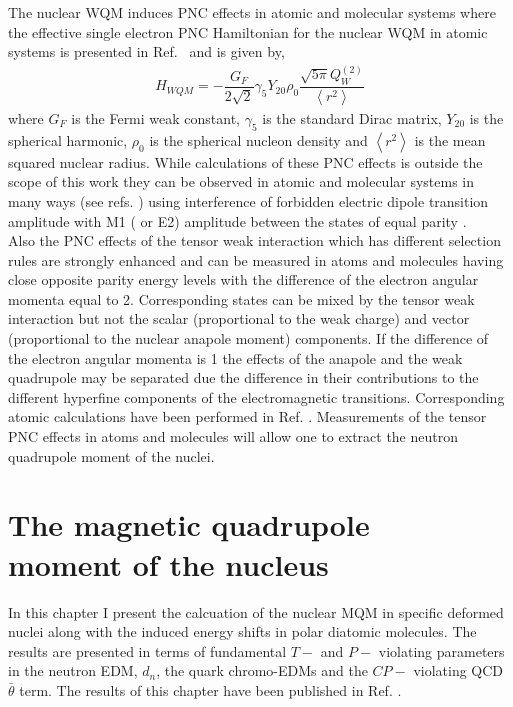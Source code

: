 \documentclass[10pt,a4paper, twoside, openright]{report}
\begin{document}
The nuclear WQM induces PNC effects in atomic and molecular systems where the effective single electron  PNC Hamiltonian for the nuclear WQM in atomic systems is presented in Ref.~\cite{FDC17} and is given by,
\begin{align*}
H_{WQM}=-\dfrac{G_F}{2\sqrt{2}}\gamma_5Y_{20}\rho_{0}\dfrac{\sqrt{5\pi}Q_{W}^{(2)}}{\left<r^2\right>}
\end{align*}
where $G_F$ is the Fermi weak constant, $\gamma_5$ is the standard Dirac matrix, $Y_{20}$ is the spherical harmonic, $\rho_0$ is the spherical nucleon density and $\left<r^2\right>$ is the mean squared nuclear radius. While calculations of these PNC effects is outside the scope of this work they can be observed in atomic and molecular systems in many ways (see refs. \cite{FDC17, Roberts2015, KhriplovichPNC, GingesReview}) using interference of forbidden electric dipole transition amplitude with M1 ( or E2) amplitude between the states of equal parity \cite{FDC17}.\\
\linebreak
Also the PNC effects of the tensor weak interaction which has different selection rules are strongly enhanced  and can be measured in atoms and molecules having close opposite parity energy levels with the difference of the electron angular momenta equal to 2. Corresponding states can be mixed by the tensor weak interaction but not the scalar (proportional to the  weak charge) and vector (proportional to the nuclear anapole moment) components. If the difference of the electron angular momenta is 1 the effects of the anapole and the weak quadrupole may be separated due the difference in their contributions to the different hyperfine components of the electromagnetic transitions. Corresponding atomic calculations have been performed in Ref.  \cite{FDC17}. Measurements of the tensor PNC effects in atoms and molecules will allow one to extract  the neutron quadrupole moment of the nuclei. \\

\chapter[The magnetic quadrupole moment of the nucleus]{The magnetic quadrupole \\ moment of the nucleus} \label{chap:MQM}
In this chapter I present the calcuation of the nuclear MQM in specific deformed nuclei along with the induced energy shifts in polar diatomic molecules. The results are presented in terms of fundamental $T-$ and $P-$ violating parameters in the neutron EDM, $d_n$, the quark chromo-EDMs and the $CP-$ violating QCD $\bar{\theta}$ term. The results of this chapter have been published in Ref. \cite{LFMQM2018}.
\end{document}
